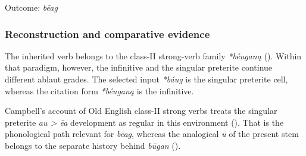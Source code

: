 \documentclass[
  british,
  a4paper,
]{article}
\begin{document}
\noindent{} \endgroup

Outcome: \emph{bēag}

\subsubsection{Reconstruction and comparative
evidence}\label{reconstruction-and-comparative-evidence-1}

The inherited verb belongs to the class-II strong-verb family
\emph{*béuganą} (). Within that paradigm, however, the infinitive and the singular
preterite continue different ablaut grades. The selected input
\emph{*báug} is the singular preterite cell, whereas the citation form
\emph{*béuganą} is the infinitive.

Campbell's account of Old English class-II strong verbs treats the
singular preterite \emph{au \textgreater{} ēa} development as regular in
this environment (). That
is the phonological path relevant for \emph{bēag}, whereas the
analogical \emph{ū} of the present stem belongs to the separate history
behind \emph{būgan} ().
\end{document}
